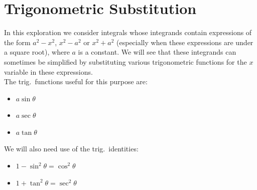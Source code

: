 \documentclass[12pt,letterpaper,fleqn]{article}
\theoremstyle{definition}
\begin{document}
\section*{Trigonometric Substitution}
In this exploration we consider integrals whose integrands contain expressions of the form $a^2 - x^2$, $x^2 - a^2$ or $x^2 + a^2$ (especially when these expressions are under a square root), where $a$ is a constant. We will see that these integrands can sometimes be simplified by substituting various trigonometric functions for the $x$ variable in these expressions.\\[1.5ex] The trig.\ functions useful for this purpose are:
\begin{itemize}
 \item $a\sin\theta$
 \item $a\sec\theta$
 \item $a\tan\theta$
\end{itemize}
We will also need use of the trig.\ identities:
\begin{itemize}
 \item $1 - \sin^2\theta = \cos^2\theta$
 \item $1 + \tan^2\theta = \sec^2\theta$
\end{itemize}
\end{document}
